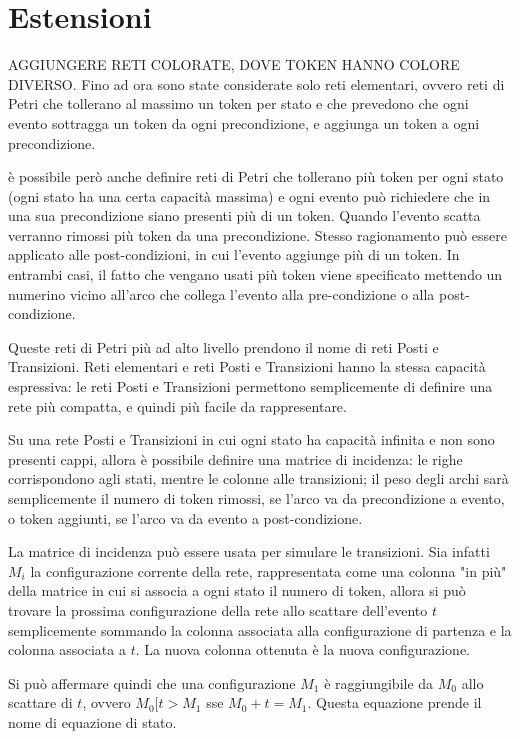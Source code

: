 \section{Estensioni}
AGGIUNGERE RETI COLORATE, DOVE TOKEN HANNO COLORE DIVERSO.
Fino ad ora sono state considerate solo reti elementari, ovvero reti di Petri
che tollerano al massimo un token per stato e che prevedono che ogni evento
sottragga un token da ogni precondizione, e aggiunga un token a ogni
precondizione.

è possibile però anche definire reti di Petri che tollerano più token
per ogni stato (ogni stato ha una certa capacità massima) e ogni evento
può richiedere che in una sua precondizione siano presenti più di un token.
Quando l'evento scatta verranno rimossi più token da una precondizione.
Stesso ragionamento può essere applicato alle post-condizioni, in cui l'evento
aggiunge più di un token.
In entrambi casi, il fatto che vengano usati più token viene specificato mettendo
un numerino vicino all'arco che collega l'evento alla pre-condizione o alla
post-condizione.

Queste reti di Petri più ad alto livello prendono il nome di reti Posti e Transizioni.
Reti elementari e reti Posti e Transizioni hanno la stessa capacità espressiva:
le reti Posti e Transizioni permettono semplicemente di definire una rete
più compatta, e quindi più facile da rappresentare.

Su una rete Posti e Transizioni in cui ogni stato ha capacità infinita
e non sono presenti cappi, allora è possibile definire una matrice di incidenza:
le righe corrispondono agli stati, mentre le colonne alle transizioni;
il peso degli archi sarà semplicemente il numero di token rimossi, se l'arco
va da precondizione a evento, o token aggiunti, se l'arco va da evento a
post-condizione.

La matrice di incidenza può essere usata per simulare le transizioni.
Sia infatti $M_i$ la configurazione corrente della rete, rappresentata come
una colonna "in più" della matrice in cui si associa a ogni stato il numero
di token, allora si può trovare la prossima configurazione della rete
allo scattare dell'evento $t$ semplicemente sommando la colonna associata
alla configurazione di partenza e la colonna associata a $t$.
La nuova colonna ottenuta è la nuova configurazione.

Si può affermare quindi che una configurazione $M_1$ è raggiungibile
da $M_0$ allo scattare di $t$, ovvero $M_0[t>M_1$ sse $M_0 + t = M_1$.
Questa equazione prende il nome di equazione di stato.

